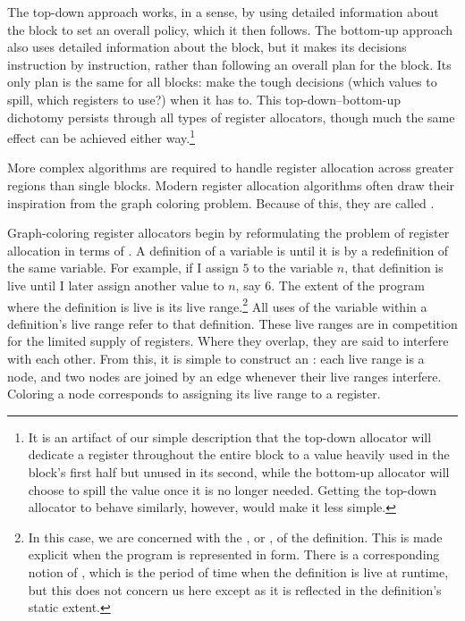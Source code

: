 The top-down approach works, in a sense, by using detailed information about the block to set an overall policy, which it then follows. The bottom-up approach also uses detailed information about the block, but it makes its decisions instruction by instruction, rather than following an overall plan for the block. Its only plan is the same for all blocks: make the tough decisions (which values to spill, which registers to use?) when it has to. This top-down--bottom-up dichotomy persists through all types of register allocators, though much the same effect can be achieved either way.\footnote{It is an artifact of our simple description that the top-down allocator will dedicate a register throughout the entire block to a value heavily used in the block's first half but unused in its second, while the bottom-up allocator will choose to spill the value once it is no longer needed. Getting the top-down allocator to behave similarly, however, would make it less simple.}

More complex algorithms are required to handle register allocation across greater regions than single blocks. Modern register allocation algorithms often draw their inspiration from the graph coloring problem. Because of this, they are called .

Graph-coloring register allocators begin by reformulating the problem of register allocation in terms of . A definition of a variable is  until it is  by a redefinition of the same variable. For example, if I assign $5$ to the variable $n$, that definition is live until I later assign another value to $n$, say $6$. The extent of the program where the definition is live is its live range.\footnote{In this case, we are concerned with the , or , of the definition. This is made explicit when the program is represented in \SSA[long] form. There is a corresponding notion of , which is the period of time when the definition is live at runtime, but this does not concern us here except as it is reflected in the definition's static extent.} All uses of the variable within a definition's live range refer to that definition. These live ranges are in competition for the limited supply of registers. Where they overlap, they are said to interfere with each other. From this, it is simple to construct an : each live range is a node, and two nodes are joined by an edge whenever their live ranges interfere. Coloring a node corresponds to assigning its live range to a register.

